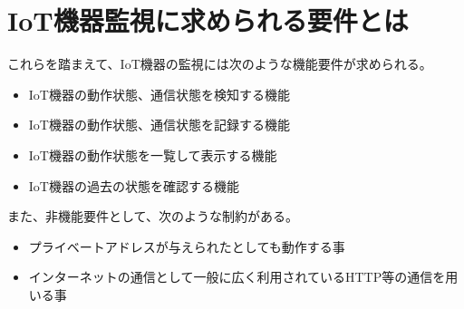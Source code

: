 \section{IoT機器監視に求められる要件とは}%
これらを踏まえて、IoT機器の監視には次のような機能要件が求められる。
\begin{itemize}
	\item IoT機器の動作状態、通信状態を検知する機能
	\item IoT機器の動作状態、通信状態を記録する機能
	\item IoT機器の動作状態を一覧して表示する機能
	\item IoT機器の過去の状態を確認する機能
\end{itemize}
また、非機能要件として、次のような制約がある。
\begin{itemize}
	\item プライベートアドレスが与えられたとしても動作する事
	\item インターネットの通信として一般に広く利用されているHTTP等の通信を用いる事
\end{itemize}

